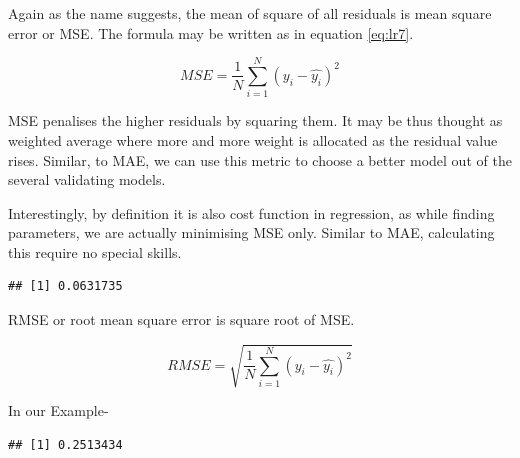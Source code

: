 \documentclass[
]{book}
\newenvironment{Shaded}{\begin{snugshade}}{\end{snugshade}}
\newcommand{\CommentTok}[1]{\textcolor[rgb]{0.56,0.35,0.01}{\textit{#1}}}
\newcommand{\DecValTok}[1]{\textcolor[rgb]{0.00,0.00,0.81}{#1}}
\newcommand{\FunctionTok}[1]{\textcolor[rgb]{0.13,0.29,0.53}{\textbf{#1}}}
\newcommand{\NormalTok}[1]{#1}
\newcommand{\SpecialCharTok}[1]{\textcolor[rgb]{0.81,0.36,0.00}{\textbf{#1}}}
\begin{document}
Again as the name suggests, the mean of square of all residuals is mean square error or MSE. The formula may be written as in equation \eqref{eq:lr7}.

\begin{equation} 
{MSE} = \frac{1}{N}\sum_{i = 1}^{N}({y_i - \hat{y_i}})^2
\label{eq:lr7}
\end{equation}

MSE penalises the higher residuals by squaring them. It may be thus thought as weighted average where more and more weight is allocated as the residual value rises. Similar, to MAE, we can use this metric to choose a better model out of the several validating models.

Interestingly, by definition it is also cost function in regression, as while finding parameters, we are actually minimising MSE only. Similar to MAE, calculating this require no special skills.

\begin{Shaded}
\end{Shaded}

\begin{verbatim}
## [1] 0.0631735
\end{verbatim}

RMSE or root mean square error is square root of MSE.

\begin{equation} 
{RMSE} = \sqrt{\frac{1}{N}\sum_{i = 1}^{N}({y_i - \hat{y_i}})^2}
\label{eq:lr8}
\end{equation}

In our Example-

\begin{Shaded}
\end{Shaded}

\begin{verbatim}
## [1] 0.2513434
\end{verbatim}
\end{document}
